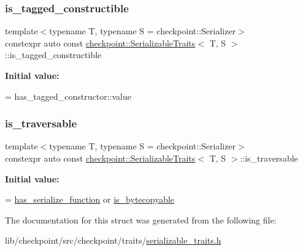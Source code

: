 \subsubsection{\texorpdfstring{is\+\_\+tagged\+\_\+constructible}{is\_tagged\_constructible}}
{\footnotesize\ttfamily template$<$typename T, typename S = checkpoint\+::\+Serializer$>$ \\
constexpr auto const \hyperlink{structcheckpoint_1_1_serializable_traits}{checkpoint\+::\+Serializable\+Traits}$<$ T, S $>$\+::is\+\_\+tagged\+\_\+constructible\hspace{0.3cm}{\ttfamily [static]}}

{\bfseries Initial value\+:}
\begin{DoxyCode}
=
    has\_tagged\_constructor::value
\end{DoxyCode}
\mbox{\label{structcheckpoint_1_1_serializable_traits_a426639501cd0ce23cb14c7b2ff982fc1}} 
\subsubsection{\texorpdfstring{is\+\_\+traversable}{is\_traversable}}
{\footnotesize\ttfamily template$<$typename T, typename S = checkpoint\+::\+Serializer$>$ \\
constexpr auto const \hyperlink{structcheckpoint_1_1_serializable_traits}{checkpoint\+::\+Serializable\+Traits}$<$ T, S $>$\+::is\+\_\+traversable\hspace{0.3cm}{\ttfamily [static]}}

{\bfseries Initial value\+:}
\begin{DoxyCode}
=
    \hyperlink{structcheckpoint_1_1_serializable_traits_a4d17a7627a8e033cccb5cf4e6b8fd0dc}{has\_serialize\_function} or \hyperlink{structcheckpoint_1_1_serializable_traits_a19e58ea0f510be10502e476258ed14ae}{is\_bytecopyable}
\end{DoxyCode}


The documentation for this struct was generated from the following file\+:\begin{DoxyCompactItemize}
\item 
lib/checkpoint/src/checkpoint/traits/\hyperlink{serializable__traits_8h}{serializable\+\_\+traits.\+h}\end{DoxyCompactItemize}
